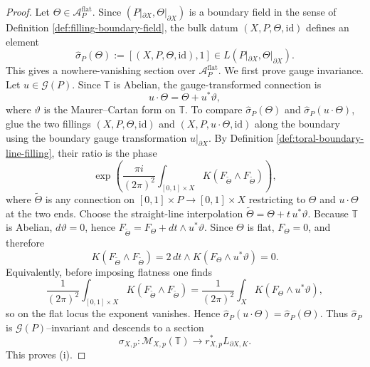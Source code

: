 \documentclass[12pt]{amsart}
\numberwithin{equation}{section}
\begin{document}
\begin{proof}
Let $\Theta\in \mathcal A^{\mathrm{flat}}_P$. Since $(P|_{\partial X},\Theta|_{\partial X})$
is a boundary field in the sense of Definition \ref{def:filling-boundary-field}, the bulk datum $(X,P,\Theta,\mathrm{id})$
defines an element
\[
\widehat{\sigma}_P(\Theta):=[(X,P,\Theta,\mathrm{id}),1]\in
L(P|_{\partial X},\Theta|_{\partial X}).
\]
This gives a nowhere-vanishing section over $\mathcal A^{\mathrm{flat}}_P$. We first prove gauge invariance. Let $u\in \mathcal G(P)$. Since $\mathbb T$ is Abelian, the
gauge-transformed connection is
\[
u\cdot \Theta=\Theta+u^*\vartheta,
\]
where $\vartheta$ is the Maurer--Cartan form on $\mathbb T$. To compare
$\widehat{\sigma}_P(\Theta)$ and $\widehat{\sigma}_P(u\cdot\Theta)$, glue the two fillings
$(X,P,\Theta,\mathrm{id})$ and $(X,P,u\cdot\Theta,\mathrm{id})$ along the boundary using the
boundary gauge transformation $u|_{\partial X}$. By Definition \ref{def:toral-boundary-line-filling}, their ratio is the phase
\[
\exp\!\left(
\frac{\pi i}{(2\pi)^2}\int_{[0,1]\times X} K(F_{\widetilde\Theta}\wedge F_{\widetilde\Theta})
\right),
\]
where $\widetilde\Theta$ is any connection on $[0,1]\times P\to [0,1]\times X$ restricting to
$\Theta$ and $u\cdot\Theta$ at the two ends. Choose the straight-line interpolation $\widetilde\Theta=\Theta+t\,u^*\vartheta.$
Because $\mathbb T$ is Abelian, $d\vartheta=0$, hence $F_{\widetilde\Theta}=F_\Theta+dt\wedge u^*\vartheta.$ Since $\Theta$ is flat, $F_\Theta=0$, and therefore
\[
K(F_{\widetilde\Theta}\wedge F_{\widetilde\Theta})
=
2\,dt\wedge K(F_\Theta\wedge u^*\vartheta)=0.
\]
Equivalently, before imposing flatness one finds
\[
\frac{1}{(2\pi)^2}\int_{[0,1]\times X} K(F_{\widetilde\Theta}\wedge F_{\widetilde\Theta})
=
\frac{1}{(2\pi)^2}\int_X K(F_\Theta\wedge u^*\vartheta),
\]
so on the flat locus the exponent vanishes. Hence $\widehat{\sigma}_P(u\cdot\Theta)=\widehat{\sigma}_P(\Theta).$ Thus $\widehat{\sigma}_P$ is $\mathcal G(P)$--invariant and descends to a section
\[
\sigma_{X,p}\colon \mathcal M_{X,p}(\mathbb T)\to r_{X,p}^*L_{\partial X,K}.
\]
This proves (i).


\end{proof}
\end{document}
